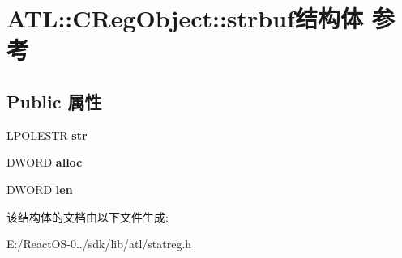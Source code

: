 \hypertarget{struct_a_t_l_1_1_c_reg_object_1_1strbuf}{}\section{A\+TL\+:\+:C\+Reg\+Object\+:\+:strbuf结构体 参考}
\label{struct_a_t_l_1_1_c_reg_object_1_1strbuf}
\subsection*{Public 属性}
\begin{DoxyCompactItemize}
\item 
\mbox{\label{struct_a_t_l_1_1_c_reg_object_1_1strbuf_a5440bf2b3f08574ac9674d3afd7067d2}} 
L\+P\+O\+L\+E\+S\+TR {\bfseries str}
\item 
\mbox{\label{struct_a_t_l_1_1_c_reg_object_1_1strbuf_a9b9eabe1df3d766e369ac080657ff420}} 
D\+W\+O\+RD {\bfseries alloc}
\item 
\mbox{\label{struct_a_t_l_1_1_c_reg_object_1_1strbuf_a4d13d5c4ad68f1e6677c05301b12feff}} 
D\+W\+O\+RD {\bfseries len}
\end{DoxyCompactItemize}


该结构体的文档由以下文件生成\+:\begin{DoxyCompactItemize}
\item 
E\+:/\+React\+O\+S-\/0../sdk/lib/atl/statreg.\+h\end{DoxyCompactItemize}
